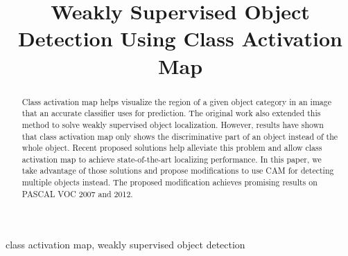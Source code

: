 \documentclass[conference]{IEEEtran}
\begin{document}
\title{Weakly Supervised Object Detection Using Class Activation Map\\
}

\author{
    \and
    \and
}

\maketitle

\begin{abstract}
    Class activation map helps visualize the region of a given object category in an image that an accurate classifier uses for prediction. The original work also extended this method to solve weakly supervised object localization. However, results have shown that class activation map only shows the discriminative part of an object instead of the whole object. Recent proposed solutions help alleviate this problem and allow class activation map to achieve state-of-the-art localizing performance. In this paper, we take advantage of those solutions and propose modifications to use CAM for detecting multiple objects instead. The proposed modification achieves promising results on PASCAL VOC 2007 and 2012.
\end{abstract}

\begin{IEEEkeywords}
    class activation map, weakly supervised object detection
\end{IEEEkeywords}
\end{document}

